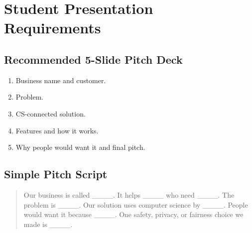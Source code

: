\documentclass[11pt]{article}
\begin{document}
\section{Student Presentation Requirements}
\subsection{Recommended 5-Slide Pitch Deck}
\begin{enumerate}
  \item Business name and customer.
  \item Problem.
  \item CS-connected solution.
  \item Features and how it works.
  \item Why people would want it and final pitch.
\end{enumerate}

\subsection{Simple Pitch Script}
\begin{quote}
Our business is called \_\_\_\_. It helps \_\_\_\_ who need \_\_\_\_. The problem is \_\_\_\_. Our solution uses computer science by \_\_\_\_. People would want it because \_\_\_\_. One safety, privacy, or fairness choice we made is \_\_\_\_.
\end{quote}
\end{document}
